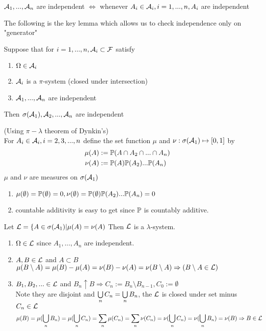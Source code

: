 \begin{ex}
$\mathcal{A}_1, ..., \mathcal{A}_n$ are independent $\Longleftrightarrow$ whenever $A_i\in \mathcal{A}_i, i = 1,...,n, A_i$ are independent 
\end{ex}
\newpage
The following is the key lemma which allows us to check independence only on "generator"
\begin{lem}
Suppose that for $i = 1,...,n, \mathcal{A}_i\subset \mathcal{F}$ satisfy
\begin{enumerate}
    \item $\Omega \in \mathcal{A}_i$
    \item $\mathcal{A}_i$ is a $\pi$-system (closed under intersection)
    \item $\mathcal{A}_1, ..., \mathcal{A}_n$ are independent
\end{enumerate}
Then $\sigma(\mathcal{A}_1), \mathcal{A}_2, ..., \mathcal{A}_n$ are independent
\end{lem}
\pf (Using $\pi-\lambda$ theorem of Dynkin's) \\
For $A_i \in \mathcal{A}_i, i=2,3,...,n$ define the set function $\mu$ and $\nu: \sigma(\mathcal{A}_1) \mapsto [0,1]$ by
\begin{align*}
    \mu(A) &:= \mathbb{P}(A \cap A_2 \cap ... \cap A_n) \\
    \nu(A) &:= \mathbb{P}(A)\mathbb{P}(A_2)...\mathbb{P}(A_n)
\end{align*} $\mu$ and $\nu$ are measures on $\sigma(\mathcal{A}_1)$
\begin{enumerate}
    \item $\mu(\emptyset) = \mathbb{P}(\emptyset) = 0, \nu(\emptyset) = \mathbb{P}(\emptyset)\mathbb{P}(A_2)...\mathbb{P}(A_n) = 0$
    \item countable additivity is easy to get since $\mathbb{P}$ is countably additive.
\end{enumerate}
Let $\mathcal{L} = \{A\in \sigma(\mathcal{A}_1)| \mu(A) = \nu(A)$ Then $\mathcal{L}$ is a $\lambda$-system.
\begin{enumerate}
    \item $\Omega \in \mathcal{L}$ since $A_1, ..., A_n$ are independent.
    \item $A,B\in \mathcal{L}$ and $A\subset B$ \\
    $\mu(B\setminus A) = \mu(B) - \mu(A) = \nu(B) - \nu(A) = \nu(B\setminus A) \Rightarrow (B\setminus A\in \mathcal{L})$
    \item $B_1, B_2, ... \in \mathcal{L}$ and $B_n \uparrow B \Rightarrow C_n := B_n \setminus B_{n-1}, C_0 := \emptyset$ \\
    Note they are disjoint and $\bigcup\limits_{n}C_n = \bigcup\limits_{n}B_n$, the $\mathcal{L}$ is closed under set minus $C_n\in \mathcal{L}$
    \begin{equation*}
        \mu(B) = \mu(\bigcup\limits_{n}B_n) = \mu(\bigcup\limits_{n}C_n) =\sum\limits_{n}\mu(C_n)= \sum\limits_{n}\nu(C_n)=\nu(\bigcup\limits_{n}C_n) = \nu(\bigcup\limits_{n}B_n) = \nu(B) \Rightarrow B \in \mathcal{L}
    \end{equation*}
\end{enumerate}
